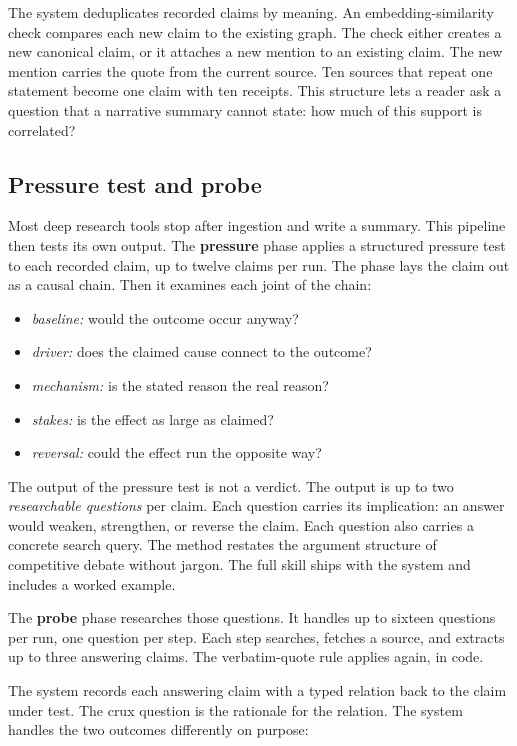 \documentclass[10pt,twocolumn]{article}
\begin{document}
The system deduplicates recorded claims by meaning. An
embedding-similarity check compares each new claim to the existing graph.
The check either creates a new canonical claim, or it attaches a new
mention to an existing claim. The new mention carries the quote from the
current source. Ten sources that repeat one statement become one claim
with ten receipts. This structure lets a reader ask a question that a
narrative summary cannot state: how much of this support is correlated?

\subsection{Pressure test and probe}
\label{sec:pressure}

Most deep research tools stop after ingestion and write a summary. This
pipeline then tests its own output. The \textbf{pressure} phase applies a
structured pressure test to each recorded claim, up to twelve claims per
run. The phase lays the claim out as a causal chain. Then it examines
each joint of the chain:

\begin{itemize}
\item \emph{baseline:} would the outcome occur anyway?
\item \emph{driver:} does the claimed cause connect to the outcome?
\item \emph{mechanism:} is the stated reason the real reason?
\item \emph{stakes:} is the effect as large as claimed?
\item \emph{reversal:} could the effect run the opposite way?
\end{itemize}

The output of the pressure test is not a verdict. The output is up to two
\emph{researchable questions} per claim. Each question carries its
implication: an answer would weaken, strengthen, or reverse the claim.
Each question also carries a concrete search query. The method restates
the argument structure of competitive debate without jargon. The full
skill ships with the system and includes a worked example.

The \textbf{probe} phase researches those questions. It handles up to
sixteen questions per run, one question per step. Each step searches,
fetches a source, and extracts up to three answering claims. The
verbatim-quote rule applies again, in code.

The system records each answering claim with a typed relation back to the
claim under test. The crux question is the rationale for the relation.
The system handles the two outcomes differently on purpose:
\end{document}
